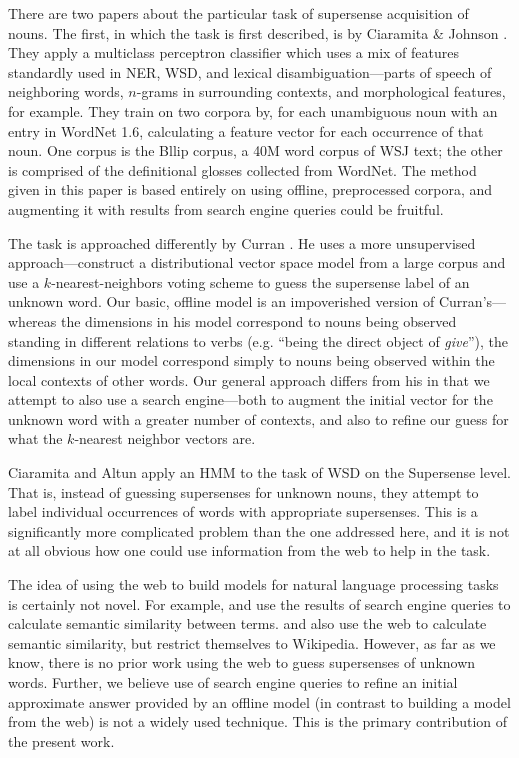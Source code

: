 \documentclass{article}
\begin{document}
There are two papers about the particular task of supersense acquisition of nouns.
The first, in which the task is first described, is by Ciaramita \& Johnson \cite{cj}.
They apply a multiclass perceptron classifier which uses a mix of features standardly used in NER, WSD, and lexical disambiguation---parts of speech of neighboring words, $n$-grams in surrounding contexts, and morphological features, for example.
They train on two corpora by, for each unambiguous noun with an entry in WordNet 1.6, calculating a feature vector for each occurrence of that noun.
One corpus is the Bllip corpus, a 40M word corpus of WSJ text; the other is comprised of the definitional glosses collected from WordNet.
The method given in this paper is based entirely on using offline, preprocessed corpora, and augmenting it with results from search engine queries could be fruitful.

The task is approached differently by Curran \cite{curran}.
He uses a more unsupervised approach---construct a distributional vector space model from a large corpus and use a $k$-nearest-neighbors voting scheme to guess the supersense label of an unknown word.
Our basic, offline model is an impoverished version of Curran's---whereas the dimensions in his model correspond to nouns being observed standing in different relations to verbs (e.g. ``being the direct object of {\it give}''), the dimensions in our model correspond simply to nouns being observed within the local contexts of other words.
Our general approach differs from his in that we attempt to also use a search engine---both to augment the initial vector for the unknown word with a greater number of contexts, and also to refine our guess for what the $k$-nearest neighbor vectors are.

Ciaramita and Altun \cite{ciaramita-altun} apply an HMM to the task of WSD on the Supersense level.
That is, instead of guessing supersenses for unknown nouns, they attempt to label individual occurrences of words with appropriate supersenses.
This is a significantly more complicated problem than the one addressed here, and it is not at all obvious how one could use information from the web to help in the task.


The idea of using the web to build models for natural language processing tasks is certainly not novel.
For example, \cite{bollegala} and \cite{gracia} use the results of search engine queries to calculate semantic similarity between terms.
\cite{strube} and \cite{gabrilovich} also use the web to calculate semantic similarity, but restrict themselves to Wikipedia.
However, as far as we know, there is no prior work using the web to guess supersenses of unknown words.
Further, we believe use of search engine queries to refine an initial approximate answer provided by an offline model (in contrast to building a model from the web) is not a widely used technique.
This is the primary contribution of the present work.
\end{document}
